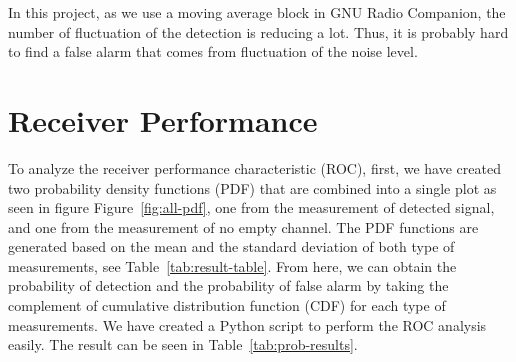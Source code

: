 In this project, as we use a moving average block in GNU Radio Companion, the number of fluctuation of the detection is reducing a lot. Thus, it is probably hard to find a false alarm that comes from fluctuation of the noise level.

\section{Receiver Performance}

To analyze the receiver performance characteristic (ROC), first, we have created two probability density functions (PDF) that are combined into a single plot as seen in figure Figure~\ref{fig:all-pdf}, one from the measurement of detected signal, and one from the measurement of no empty channel. The PDF functions are generated based on the mean and the standard deviation of both type of measurements, see Table~\ref{tab:result-table}. From here, we can obtain the probability of detection and the probability of false alarm by taking the complement of cumulative distribution function (CDF) for each type of measurements. We have created a Python script to perform the ROC analysis easily. The result can be seen in Table~\ref{tab:prob-results}.

\begin{table}[H]
    \caption{Signal measurement results}
    \label{tab:prob-results}
\end{table}

